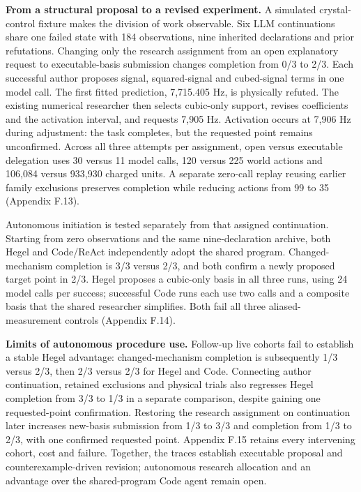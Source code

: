 \documentclass[twoside,11pt]{article}
\begin{document}
\textbf{From a structural proposal to a revised experiment.} A simulated crystal-control fixture makes the division of work observable. Six LLM continuations share one failed state with 184 observations, nine inherited declarations and prior refutations. Changing only the research assignment from an open explanatory request to executable-basis submission changes completion from 0/3 to 2/3. Each successful author proposes signal, squared-signal and cubed-signal terms in one model call. The first fitted prediction, 7,715.405 Hz, is physically refuted. The existing numerical researcher then selects cubic-only support, revises coefficients and the activation interval, and requests 7,905 Hz. Activation occurs at 7,906 Hz during adjustment: the task completes, but the requested point remains unconfirmed. Across all three attempts per assignment, open versus executable delegation uses 30 versus 11 model calls, 120 versus 225 world actions and 106,084 versus 933,930 charged units. A separate zero-call replay reusing earlier family exclusions preserves completion while reducing actions from 99 to 35 (Appendix F.13).


Autonomous initiation is tested separately from that assigned continuation. Starting from zero observations and the same nine-declaration archive, both Hegel and Code/ReAct independently adopt the shared program. Changed-mechanism completion is 3/3 versus 2/3, and both confirm a newly proposed target point in 2/3. Hegel proposes a cubic-only basis in all three runs, using 24 model calls per success; successful Code runs each use two calls and a composite basis that the shared researcher simplifies. Both fail all three aliased-measurement controls (Appendix F.14).


\textbf{Limits of autonomous procedure use.} Follow-up live cohorts fail to establish a stable Hegel advantage: changed-mechanism completion is subsequently 1/3 versus 2/3, then 2/3 versus 2/3 for Hegel and Code. Connecting author continuation, retained exclusions and physical trials also regresses Hegel completion from 3/3 to 1/3 in a separate comparison, despite gaining one requested-point confirmation. Restoring the research assignment on continuation later increases new-basis submission from 1/3 to 3/3 and completion from 1/3 to 2/3, with one confirmed requested point. Appendix F.15 retains every intervening cohort, cost and failure. Together, the traces establish executable proposal and counterexample-driven revision; autonomous research allocation and an advantage over the shared-program Code agent remain open.
\end{document}
